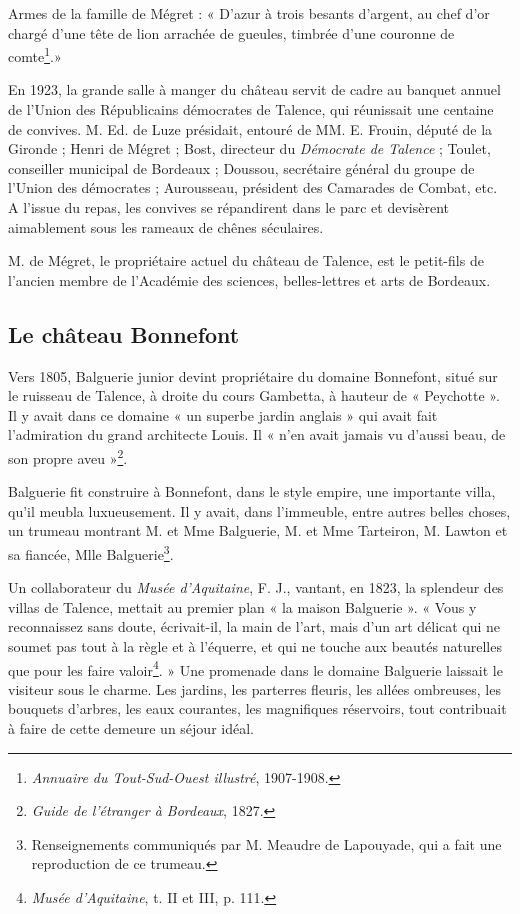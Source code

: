 Armes de la famille de Mégret : « D'azur à trois besants d'argent, au chef d'or chargé d'une tête de lion arrachée de gueules, timbrée d'une couronne de comte\footnote{\textit{Annuaire du Tout-Sud-Ouest illustré}, 1907-1908.}.»

En 1923, la grande salle à manger du château servit de cadre au banquet annuel de l'Union des Républicains démocrates de Talence, qui réunissait une centaine de convives. M. Ed. de Luze présidait, entouré de MM. E. Frouin, député de la Gironde ; Henri de Mégret ; Bost, directeur du \textit{Démocrate de Talence} ; Toulet, conseiller municipal de Bordeaux ; Doussou, secrétaire général du groupe de l'Union des démocrates ; Aurousseau, président des Camarades de Combat, etc. A l'issue du repas, les convives se répandirent dans le parc et devisèrent aimablement sous les rameaux de chênes séculaires.

M. de Mégret, le propriétaire actuel du château de Talence, est le petit-fils de l'ancien membre de l'Académie des sciences, belles-lettres et arts de Bordeaux. 

\subsection{Le château Bonnefont}

Vers 1805, Balguerie junior devint propriétaire du domaine Bonnefont, situé sur le ruisseau de Talence, à droite du cours Gambetta, à hauteur de « Peychotte ». Il y avait dans ce domaine « un superbe jardin anglais » qui avait fait l'admiration du grand architecte Louis. Il « n'en avait jamais vu d'aussi beau, de son propre aveu »\footnote{\textit{Guide de l'étranger à Bordeaux}, 1827.}. 

Balguerie fit construire à Bonnefont, dans le style empire, une importante villa, qu'il meubla luxueusement. Il y avait, dans l'immeuble, entre autres belles choses, un trumeau montrant M. et Mme Balguerie, M. et Mme Tarteiron, M. Lawton et sa fiancée, Mlle Balguerie\footnote{Renseignements communiqués par M. Meaudre de Lapouyade, qui a fait une reproduction de ce trumeau.}.

Un collaborateur du \textit{Musée d'Aquitaine}, F. J., vantant, en 1823, la splendeur des villas de Talence, mettait au premier plan « la maison Balguerie ». « Vous y reconnaissez sans doute, écrivait-il, la main de l'art, mais d'un art délicat qui ne soumet pas tout à la règle et à l'équerre, et qui ne touche aux beautés naturelles que pour les faire valoir\footnote{\textit{Musée d'Aquitaine}, t. II et III, p. 111.}. » Une promenade dans le domaine Balguerie laissait le visiteur sous le charme. Les jardins, les parterres fleuris, les allées ombreuses, les bouquets d'arbres, les eaux courantes, les magnifiques réservoirs, tout contribuait à faire de cette demeure un séjour idéal.

